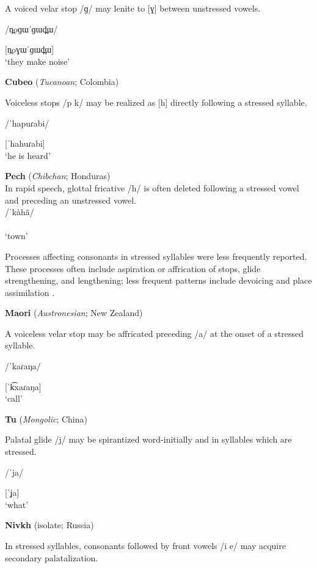 A voiced velar stop /ɡ/ may lenite to [ɣ] between unstressed vowels.

/n̪oɡɯˈɡɯd̪ɯ/

[n̪oɣɯˈɡɯd̪ɯ]\\
\glt ‘they make noise’
\citep[27]{Donohue1999}
\z

\ea\label{ex:5.20}
  \textbf{Cubeo} (\textit{Tucanoan}; Colombia)

Voiceless stops /p k/ may be realized as [h] directly following a stressed syllable.

/ˈhapuɾabi/

[ˈhahuɾabi]\\
\glt ‘he is heard’
\citep[123]{Chacon2012}
\z



\ea\label{ex:5.21}
  \textbf{Pech} (\textit{Chibchan}; Honduras)\\
In rapid speech, glottal fricative /h/ is often deleted following a stressed vowel and preceding an unstressed vowel.\\
/ˈkàhã/\\\relax
[ˈk\`{ã}ː]\\
\glt ‘town’
\citep[24]{Holt1999}
\z

  Processes affecting consonants in stressed syllables were less frequently reported. These processes often include aspiration or affrication of stops, glide strengthening, and lengthening; less frequent patterns include devoicing and place assimilation .

\ea\label{ex:5.22}
  \textbf{Maori} (\textit{Austronesian}; New Zealand)

A voiceless velar stop may be affricated preceding /a/ at the onset of a stressed syllable.

/ˈkaɾaŋa/

[ˈk͡xaɾaŋa]\\
\glt ‘call’
\citep[521-2]{Bauer1999}
\z

\ea\label{ex:5.23}
  \textbf{Tu} (\textit{Mongolic}; China)

Palatal glide /j/ may be spirantized word-initially and in syllables which are stressed.

/ˈja/

[ˈʝa]\\
\glt ‘what’
\citep[31-2]{Slater2003}
\z

\ea\label{ex:5.24}
  \textbf{Nivkh} (isolate; Russia)

In stressed syllables, consonants followed by front vowels /i e/ may acquire secondary palatalization.

